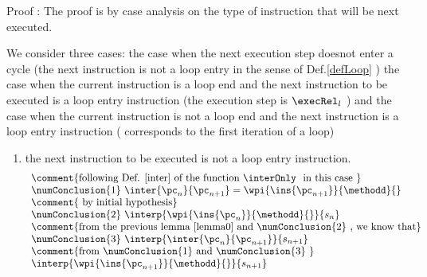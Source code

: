 Proof :
The proof is by case analysis on the type of instruction that will be next executed. 

 We consider three cases: the case when the next execution step doesnot enter a cycle (the next instruction is not a loop entry in the sense of Def.\ref{defLoop} )
the case when the current instruction is a loop end and the next instruction to be executed is a loop entry instruction (the execution step is $\execRel_l$ )
and the case when the current instruction is not a loop end and the next instruction is a loop entry instruction ( corresponds to the first iteration of a loop) 

  
\begin{enumerate}
  \item the next instruction to be executed is not a loop entry instruction. 
           $$ \begin{array}{l}
	      \mbox{\rm \comment{following Def. \ref{inter} of the function \interOnly \ in this case }}\\
              \numConclusion{1} \ \inter{\pc_n}{\pc_{n+1}} = \wpi{ \ins{\pc_{n+1} }}{\methodd}{}\\
	      \mbox{\rm \comment{ by initial hypothesis}} \\
	      \numConclusion{2} \ \interp{\wpi{\ins{\pc_{n}} }{ \methodd }{} }{ s_n }\\
	      \mbox{\rm \comment{from the previous lemma \ref{lemma0} and \numConclusion{2} , we know that}}\\
	      \numConclusion{3} \   \interp{\inter{\pc_n}{\pc_{n+1}} }{ s_{n+1} }\\
	      \mbox{\rm \comment{from \numConclusion{1} and  \numConclusion{3} }}\\
	      \interp{ \wpi{\ins{\pc_{n+1}}}{\methodd}{} }{ s_{n+1} }
	      \end{array}$$

 
  

\end{enumerate}
